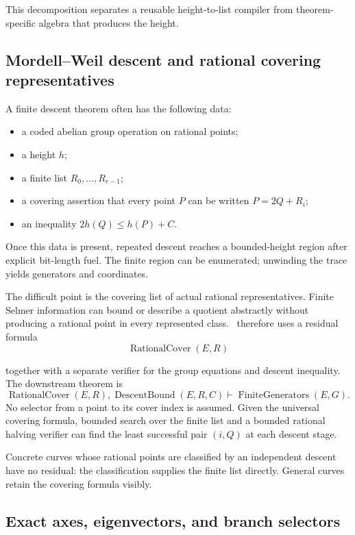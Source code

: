 This decomposition separates a reusable height-to-list compiler from theorem-specific algebra that produces the height.

\subsection{Mordell--Weil descent and rational covering representatives}

A finite descent theorem often has the following data:
\begin{itemize}
\item a coded abelian group operation on rational points;
\item a height \(h\);
\item a finite list \(R_0,\ldots,R_{r-1}\);
\item a covering assertion that every point \(P\) can be written \(P=2Q+R_i\);
\item an inequality \(2h(Q)\le h(P)+C\).
\end{itemize}
Once this data is present, repeated descent reaches a bounded-height region after explicit bit-length fuel.  The finite region can be enumerated; unwinding the trace yields generators and coordinates.

The difficult point is the covering list of actual rational representatives.  Finite Selmer information can bound or describe a quotient abstractly without producing a rational point in every represented class.  \CIFER\ therefore uses a residual formula
\[
 \operatorname{RationalCover}(E,R)
\]

together with a separate verifier for the group equations and descent inequality.  The downstream theorem is
\[
 \operatorname{RationalCover}(E,R),
 \operatorname{DescentBound}(E,R,C)
 \vdash \operatorname{FiniteGenerators}(E,G).
\]
No selector from a point to its cover index is assumed.  Given the universal covering formula, bounded search over the finite list and a bounded rational halving verifier can find the least successful pair \((i,Q)\) at each descent stage.

Concrete curves whose rational points are classified by an independent descent have no residual: the classification supplies the finite list directly.  General curves retain the covering formula visibly.

\subsection{Exact axes, eigenvectors, and branch selectors}


